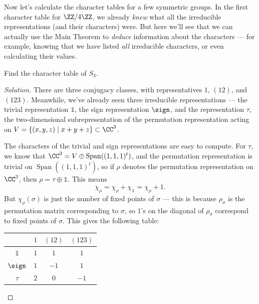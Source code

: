 Now let's calculate the character tables for a few symmetric groups. In the first character table for $\ZZ/4\ZZ$, we already \emph{knew} what all the irreducible representations (and their characters) were. But here we'll see that we can actually use the Main Theorem to \emph{deduce} information about the characters --- for example, knowing that we have listed \emph{all} irreducible characters, or even calculating their values. 

\begin{example}
Find the character table of $S_3$. 
\end{example}

\begin{proof}[Solution]
There are three conjugacy classes, with representatives $1$, $(12)$, and $(123)$. Meanwhile, we've already seen three irreducible representations --- the trivial representation $\mathds{1}$, the sign representation $\sign$, and the representation $\tau$, the two-dimensional subrepresentation of the permutation representation acting on $V = \{(x, y, z) \mid x + y + z\} \subset \CC^3$. 

The characters of the trivial and sign representations are easy to compute. For $\tau$, we know that $\CC^3 = V \oplus \operatorname{Span}((1, 1, 1)^t)$, and the permutation representation is trivial on $\operatorname{Span}((1, 1, 1)^t)$, so if $\rho$ denotes the permutation representation on $\CC^3$, then $\rho = \tau \oplus \mathds{1}$. This means \[\chi_\rho = \chi_\rho + \chi_{\mathds{1}} = \chi_\rho + 1.\] But $\chi_\rho(\sigma)$ is just the number of fixed points of $\sigma$ --- this is because $\rho_\sigma$ is the permutation matrix corresponding to $\sigma$, so $1$'s on the diagonal of $\rho_\sigma$ correspond to fixed points of $\sigma$. This gives the following table: 


\begin{center}
    \begin{tabular}{c||c|c|c}
         & $1$ & $(12)$ & $(123)$ \\
         \hline
         \hline
        $\mathds{1}$ & $1$ & $1$ & $1$ \\
        \hline
        $\sign$ & $1$ & $-1$ & $1$ \\
        \hline
        $\tau$ & $2$ & $0$ & $-1$
    \end{tabular}
\end{center}


\end{proof}
